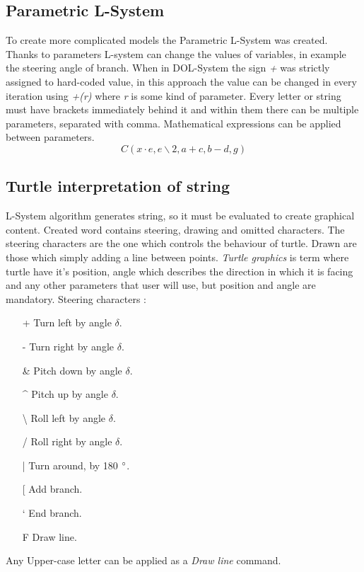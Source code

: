\documentclass[b5paper,twoside,11pt]{article}
\begin{document}
\subsection{Parametric L-System}
To create more complicated models the Parametric L-System was created. Thanks to parameters L-system can change the values of variables, in example the steering angle of branch. When in DOL-System the sign \textit{+} was strictly assigned to hard-coded value, in this approach the value can be changed in every iteration using \textit{+(r)} where \textit{r} is some kind of parameter. Every letter or string must have brackets immediately behind it and within them there can be multiple parameters, separated with comma. Mathematical expressions can be applied between parameters.
\begin{equation*}
C(x\cdot e,e\backslash 2,a+c,b-d,g)
\end{equation*}
\subsection{Turtle interpretation of string}
L-System algorithm generates string, so it must be evaluated to create graphical content. Created word contains steering, drawing and omitted characters. The steering characters are the one which controls the behaviour of turtle. Drawn are those which simply adding a line between points.
\textit{Turtle graphics} is term where turtle have it's position, angle which describes the direction in which it is facing and any other parameters that user will use, but position and angle are mandatory.
Steering characters :
  \begin{itemize}[labelindent=5.5em,labelsep=1cm,leftmargin=*]  %
\item[+] Turn  left  by  angle $\delta$.
\item[-] Turn right by angle  $\delta$.
\item[\&] Pitch down by angle  $\delta$.
\item[\string^] Pitch up by angle  $\delta$.
\item[\textbackslash] Roll left by angle  $\delta$.
\item[/] Roll right by angle  $\delta$.
\item[\string|] Turn around, by 180 $\degree $.
\item[[] Add branch.
\item[\char`\]] End branch.
\item[F] Draw line.
\end{itemize}	
Any Upper-case letter can be applied as a \textit{Draw line} command.
\end{document}
